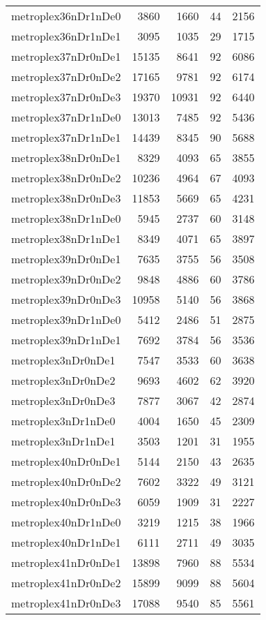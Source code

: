 \begin{longtable}{lrrrr}
metroplex36nDr1nDe0 & 3860 & 1660 & 44 & 2156 \\
metroplex36nDr1nDe1 & 3095 & 1035 & 29 & 1715 \\
metroplex37nDr0nDe1 & 15135 & 8641 & 92 & 6086 \\
metroplex37nDr0nDe2 & 17165 & 9781 & 92 & 6174 \\
metroplex37nDr0nDe3 & 19370 & 10931 & 92 & 6440 \\
metroplex37nDr1nDe0 & 13013 & 7485 & 92 & 5436 \\
metroplex37nDr1nDe1 & 14439 & 8345 & 90 & 5688 \\
metroplex38nDr0nDe1 & 8329 & 4093 & 65 & 3855 \\
metroplex38nDr0nDe2 & 10236 & 4964 & 67 & 4093 \\
metroplex38nDr0nDe3 & 11853 & 5669 & 65 & 4231 \\
metroplex38nDr1nDe0 & 5945 & 2737 & 60 & 3148 \\
metroplex38nDr1nDe1 & 8349 & 4071 & 65 & 3897 \\
metroplex39nDr0nDe1 & 7635 & 3755 & 56 & 3508 \\
metroplex39nDr0nDe2 & 9848 & 4886 & 60 & 3786 \\
metroplex39nDr0nDe3 & 10958 & 5140 & 56 & 3868 \\
metroplex39nDr1nDe0 & 5412 & 2486 & 51 & 2875 \\
metroplex39nDr1nDe1 & 7692 & 3784 & 56 & 3536 \\
metroplex3nDr0nDe1 & 7547 & 3533 & 60 & 3638 \\
metroplex3nDr0nDe2 & 9693 & 4602 & 62 & 3920 \\
metroplex3nDr0nDe3 & 7877 & 3067 & 42 & 2874 \\
metroplex3nDr1nDe0 & 4004 & 1650 & 45 & 2309 \\
metroplex3nDr1nDe1 & 3503 & 1201 & 31 & 1955 \\
metroplex40nDr0nDe1 & 5144 & 2150 & 43 & 2635 \\
metroplex40nDr0nDe2 & 7602 & 3322 & 49 & 3121 \\
metroplex40nDr0nDe3 & 6059 & 1909 & 31 & 2227 \\
metroplex40nDr1nDe0 & 3219 & 1215 & 38 & 1966 \\
metroplex40nDr1nDe1 & 6111 & 2711 & 49 & 3035 \\
metroplex41nDr0nDe1 & 13898 & 7960 & 88 & 5534 \\
metroplex41nDr0nDe2 & 15899 & 9099 & 88 & 5604 \\
metroplex41nDr0nDe3 & 17088 & 9540 & 85 & 5561 \\

\end{longtable}
